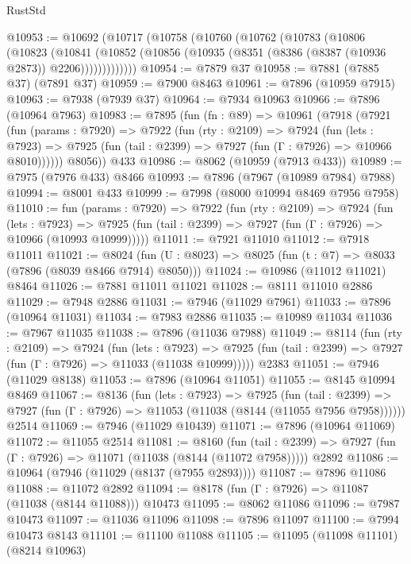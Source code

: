 \begin{lexlean}{RustStd}
\begin{coremodule}
{\begin{coremodule}
{{{{{{{{{{{{{{{{{{{{{{{{{{{{{{{{{{{{{{{{{{{{{{{{{{@10953 := @10692
    (@10717
      (@10758
        (@10760
          (@10762
            (@10783
              (@10806
                (@10823
                  (@10841
                    (@10852 (@10856 (@10935 (@8351 (@8386 (@8387 (@10936 @2873)) @2206)))))))))))))
@10954 := @7879 @37
@10958 := @7881 (@7885 @37) (@7891 @37)
@10959 := @7900 @8463
@10961 := @7896 (@10959 @7915)
@10963 := @7938 (@7939 @37)
@10964 := @7934 @10963
@10966 := @7896 (@10964 @7963)
@10983 := @7895
    (fun (fn : @89) =>
    @10961
      (@7918
        (@7921
          (fun (params : @7920) =>
          @7922
            (fun (rty : @2109) =>
            @7924
              (fun (lets : @7923) =>
              @7925 (fun (tail : @2399) => @7927 (fun (Γ : @7926) => @10966 @8010))))))
        @8056))
    @433
@10986 := @8062 (@10959 (@7913 @433))
@10989 := @7975 (@7976 @433) @8466
@10993 := @7896 (@7967 (@10989 @7984) @7988)
@10994 := @8001 @433
@10999 := @7998 (@8000 @10994 @8469 @7956 @7958)
@11010 := fun (params : @7920) =>
  @7922
    (fun (rty : @2109) =>
    @7924
      (fun (lets : @7923) =>
      @7925 (fun (tail : @2399) => @7927 (fun (Γ : @7926) => @10966 (@10993 @10999)))))
@11011 := @7921 @11010
@11012 := @7918 @11011
@11021 := @8024 (fun (U : @8023) => @8025 (fun (t : @7) => @8033 (@7896 (@8039 @8466 @7914) @8050)))
@11024 := @10986 (@11012 @11021) @8464
@11026 := @7881 @11011 @11021
@11028 := @8111 @11010 @2886
@11029 := @7948 @2886
@11031 := @7946 (@11029 @7961)
@11033 := @7896 (@10964 @11031)
@11034 := @7983 @2886
@11035 := @10989 @11034
@11036 := @7967 @11035
@11038 := @7896 (@11036 @7988)
@11049 := @8114
    (fun (rty : @2109) =>
    @7924
      (fun (lets : @7923) =>
      @7925 (fun (tail : @2399) => @7927 (fun (Γ : @7926) => @11033 (@11038 @10999)))))
    @2383
@11051 := @7946 (@11029 @8138)
@11053 := @7896 (@10964 @11051)
@11055 := @8145 @10994 @8469
@11067 := @8136
    (fun (lets : @7923) =>
    @7925
      (fun (tail : @2399) =>
      @7927 (fun (Γ : @7926) => @11053 (@11038 (@8144 (@11055 @7956 @7958))))))
    @2514
@11069 := @7946 (@11029 @10439)
@11071 := @7896 (@10964 @11069)
@11072 := @11055 @2514
@11081 := @8160
    (fun (tail : @2399) => @7927 (fun (Γ : @7926) => @11071 (@11038 (@8144 (@11072 @7958)))))
    @2892
@11086 := @10964 (@7946 (@11029 (@8137 (@7955 @2893))))
@11087 := @7896 @11086
@11088 := @11072 @2892
@11094 := @8178 (fun (Γ : @7926) => @11087 (@11038 (@8144 @11088))) @10473
@11095 := @8062 @11086
@11096 := @7987 @10473
@11097 := @11036 @11096
@11098 := @7896 @11097
@11100 := @7994 @10473 @8143
@11101 := @11100 @11088
@11105 := @11095 (@11098 @11101) (@8214 @10963)
}}}}}}}}}}}}}}}}}}}}}}}}}}}}}}}}}}}}}}}}}}}}}}}}}}
\end{coremodule}}
\end{coremodule}
\end{lexlean}

